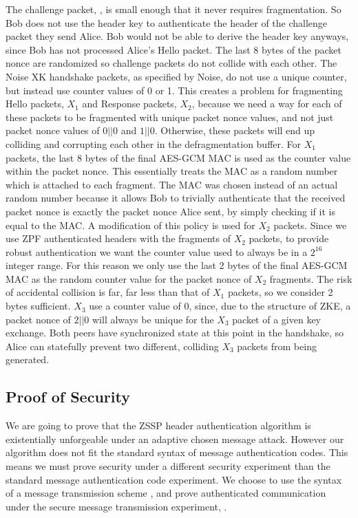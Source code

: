 \documentclass{article}
\begin{document}
The challenge packet, , is small enough that it never requires fragmentation. So Bob does not use the header key to authenticate the header of the challenge packet they send Alice. Bob would not be able to derive the header key anyways, since Bob has not processed Alice's Hello packet. The last 8 bytes of the packet nonce are randomized so challenge packets do not collide with each other.
The Noise XK handshake packets, as specified by Noise, do not use a unique counter, but instead use counter values of 0 or 1. This creates a problem for fragmenting Hello packets, $X_1$ and Response packets, $X_2$, because we need a way for each of these packets to be fragmented with unique packet nonce values, and not just packet nonce values of $0||0$ and $1||0$. Otherwise, these packets will end up colliding and corrupting each other in the defragmentation buffer. For $X_1$ packets, the last 8 bytes of the final AES-GCM MAC is used as the counter value within the packet nonce. This essentially treats the MAC as a random number which is attached to each fragment. The MAC was chosen instead of an actual random number because it allows Bob to trivially authenticate that the received packet nonce is exactly the packet nonce Alice sent, by simply checking if it is equal to the MAC. A modification of this policy is used for $X_2$ packets. Since we use ZPF authenticated headers with the fragments of $X_2$ packets, to provide robust authentication we want the counter value used to always be in a $2^{16}$ integer range. For this reason we only use the last 2 bytes of the final AES-GCM MAC as the random counter value for the packet nonce of $X_2$ fragments. The risk of accidental collision is far, far less than that of $X_1$ packets, so we consider 2 bytes sufficient. $X_3$ use a counter value of 0, since, due to the structure of ZKE, a packet nonce of $2||0$ will always be unique for the $X_3$ packet of a given key exchange. Both peers have synchronized state at this point in the handshake, so Alice can statefully prevent two different, colliding $X_3$ packets from being generated.

\subsection{Proof of Security}

We are going to prove that the ZSSP header authentication algorithm is existentially unforgeable under an adaptive chosen message attack. However our algorithm does not fit the standard syntax of message authentication codes. This means we must prove security under a different security experiment than the standard message authentication code experiment. We choose to use the syntax of a message transmission scheme \cite{modern_crypto}, and prove authenticated communication under the secure message transmission experiment, .
\end{document}

